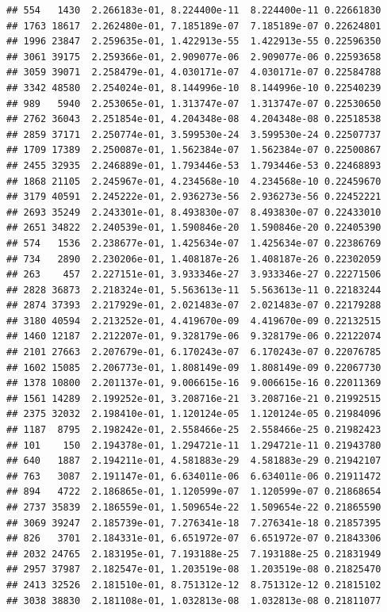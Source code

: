 \documentclass[
]{article}
\begin{document}
\begin{verbatim}
## 554   1430  2.266183e-01, 8.224400e-11  8.224400e-11 0.22661830
## 1763 18617  2.262480e-01, 7.185189e-07  7.185189e-07 0.22624801
## 1996 23847  2.259635e-01, 1.422913e-55  1.422913e-55 0.22596350
## 3061 39175  2.259366e-01, 2.909077e-06  2.909077e-06 0.22593658
## 3059 39071  2.258479e-01, 4.030171e-07  4.030171e-07 0.22584788
## 3342 48580  2.254024e-01, 8.144996e-10  8.144996e-10 0.22540239
## 989   5940  2.253065e-01, 1.313747e-07  1.313747e-07 0.22530650
## 2762 36043  2.251854e-01, 4.204348e-08  4.204348e-08 0.22518538
## 2859 37171  2.250774e-01, 3.599530e-24  3.599530e-24 0.22507737
## 1709 17389  2.250087e-01, 1.562384e-07  1.562384e-07 0.22500867
## 2455 32935  2.246889e-01, 1.793446e-53  1.793446e-53 0.22468893
## 1868 21105  2.245967e-01, 4.234568e-10  4.234568e-10 0.22459670
## 3179 40591  2.245222e-01, 2.936273e-56  2.936273e-56 0.22452221
## 2693 35249  2.243301e-01, 8.493830e-07  8.493830e-07 0.22433010
## 2651 34822  2.240539e-01, 1.590846e-20  1.590846e-20 0.22405390
## 574   1536  2.238677e-01, 1.425634e-07  1.425634e-07 0.22386769
## 734   2890  2.230206e-01, 1.408187e-26  1.408187e-26 0.22302059
## 263    457  2.227151e-01, 3.933346e-27  3.933346e-27 0.22271506
## 2828 36873  2.218324e-01, 5.563613e-11  5.563613e-11 0.22183244
## 2874 37393  2.217929e-01, 2.021483e-07  2.021483e-07 0.22179288
## 3180 40594  2.213252e-01, 4.419670e-09  4.419670e-09 0.22132515
## 1460 12187  2.212207e-01, 9.328179e-06  9.328179e-06 0.22122074
## 2101 27663  2.207679e-01, 6.170243e-07  6.170243e-07 0.22076785
## 1602 15085  2.206773e-01, 1.808149e-09  1.808149e-09 0.22067730
## 1378 10800  2.201137e-01, 9.006615e-16  9.006615e-16 0.22011369
## 1561 14289  2.199252e-01, 3.208716e-21  3.208716e-21 0.21992515
## 2375 32032  2.198410e-01, 1.120124e-05  1.120124e-05 0.21984096
## 1187  8795  2.198242e-01, 2.558466e-25  2.558466e-25 0.21982423
## 101    150  2.194378e-01, 1.294721e-11  1.294721e-11 0.21943780
## 640   1887  2.194211e-01, 4.581883e-29  4.581883e-29 0.21942107
## 763   3087  2.191147e-01, 6.634011e-06  6.634011e-06 0.21911472
## 894   4722  2.186865e-01, 1.120599e-07  1.120599e-07 0.21868654
## 2737 35839  2.186559e-01, 1.509654e-22  1.509654e-22 0.21865590
## 3069 39247  2.185739e-01, 7.276341e-18  7.276341e-18 0.21857395
## 826   3701  2.184331e-01, 6.651972e-07  6.651972e-07 0.21843306
## 2032 24765  2.183195e-01, 7.193188e-25  7.193188e-25 0.21831949
## 2957 37987  2.182547e-01, 1.203519e-08  1.203519e-08 0.21825470
## 2413 32526  2.181510e-01, 8.751312e-12  8.751312e-12 0.21815102
## 3038 38830  2.181108e-01, 1.032813e-08  1.032813e-08 0.21811077

\end{verbatim}
\end{document}
